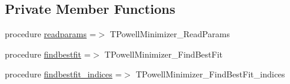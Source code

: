 \subsection*{Private Member Functions}
\begin{DoxyCompactItemize}
\item 
procedure \mbox{\hyperlink{structminimize_1_1tpowellminimizer_af8bf5fbb29baeb3e0aa6ae64e33aed22}{readparams}} =$>$ T\+Powell\+Minimizer\+\_\+\+Read\+Params
\item 
procedure \mbox{\hyperlink{structminimize_1_1tpowellminimizer_aaf3650d665c4070ddc0177ed35b7efb9}{findbestfit}} =$>$ T\+Powell\+Minimizer\+\_\+\+Find\+Best\+Fit
\item 
procedure \mbox{\hyperlink{structminimize_1_1tpowellminimizer_a194c70c653914f1ea1c10e48ba7776ce}{findbestfit\+\_\+indices}} =$>$ T\+Powell\+Minimizer\+\_\+\+Find\+Best\+Fit\+\_\+indices
\end{DoxyCompactItemize}
